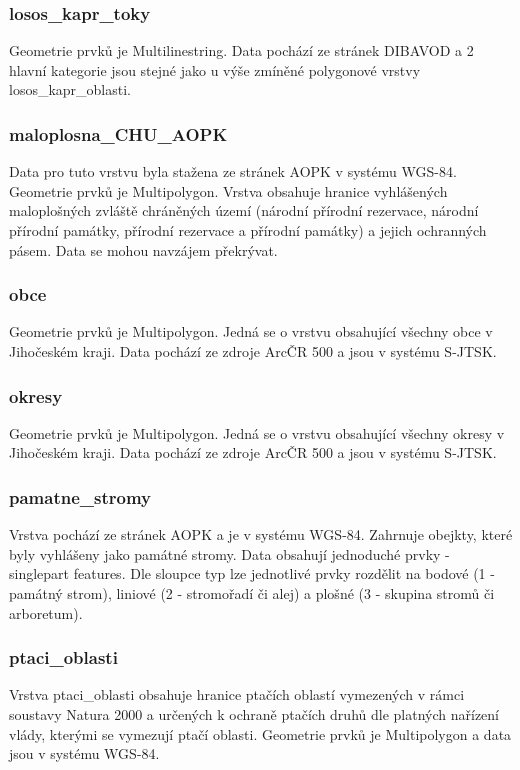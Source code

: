 \documentclass[a4paper, 12pt]{article}
\begin{document}
\subsubsection{losos\_kapr\_toky}
Geometrie prvků je Multilinestring. Data pochází ze stránek DIBAVOD a 2 hlavní kategorie jsou stejné jako u výše zmíněné polygonové vrstvy losos\_kapr\_oblasti.


\subsubsection{maloplosna\_CHU\_AOPK}
Data pro tuto vrstvu byla stažena ze stránek AOPK v systému WGS-84. Geometrie prvků je Multipolygon. Vrstva obsahuje hranice vyhlášených maloplošných zvláště chráněných území (národní přírodní rezervace, národní přírodní památky, přírodní rezervace a přírodní památky) a jejich ochranných pásem. Data se mohou navzájem překrývat. 


\subsubsection{obce}
Geometrie prvků je Multipolygon. Jedná se o vrstvu obsahující všechny obce v Jihočeském kraji. Data pochází ze zdroje ArcČR 500 a jsou v systému S-JTSK.

\subsubsection{okresy}
Geometrie prvků je Multipolygon. Jedná se o vrstvu obsahující všechny okresy v Jihočeském kraji. Data pochází ze zdroje ArcČR 500 a jsou v systému S-JTSK.

\subsubsection{pamatne\_stromy}
Vrstva pochází ze stránek AOPK a je v systému WGS-84. Zahrnuje obejkty, které byly vyhlášeny jako památné stromy. Data obsahují jednoduché prvky - singlepart features. Dle sloupce typ lze jednotlivé prvky rozdělit na bodové (1 - památný strom), liniové (2 - stromořadí či alej) a plošné (3 - skupina stromů či arboretum).

\subsubsection{ptaci\_oblasti}
Vrstva ptaci\_oblasti obsahuje hranice ptačích oblastí vymezených v rámci soustavy Natura 2000 a určených k ochraně ptačích druhů dle platných nařízení vlády, kterými se vymezují ptačí oblasti. Geometrie prvků je Multipolygon a data jsou v systému WGS-84. 
\end{document}
